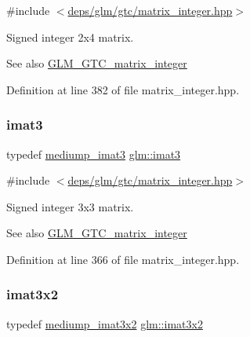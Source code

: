 {\ttfamily \#include $<$\hyperlink{matrix__integer_8hpp}{deps/glm/gtc/matrix\+\_\+integer.\+hpp}$>$}

Signed integer 2x4 matrix. \begin{DoxySeeAlso}{See also}
\hyperlink{group__gtc__matrix__integer}{G\+L\+M\+\_\+\+G\+T\+C\+\_\+matrix\+\_\+integer} 
\end{DoxySeeAlso}


Definition at line 382 of file matrix\+\_\+integer.\+hpp.

\mbox{\label{group__gtc__matrix__integer_ga45481922dd07a3a8e23758286311ee97}} 
\subsubsection{\texorpdfstring{imat3}{imat3}}
{\footnotesize\ttfamily typedef \hyperlink{group__gtc__matrix__integer_gac6ab7a5cfe157ba8deb79a7691ad8263}{mediump\+\_\+imat3} \hyperlink{group__gtc__matrix__integer_ga45481922dd07a3a8e23758286311ee97}{glm\+::imat3}}



{\ttfamily \#include $<$\hyperlink{matrix__integer_8hpp}{deps/glm/gtc/matrix\+\_\+integer.\+hpp}$>$}

Signed integer 3x3 matrix. \begin{DoxySeeAlso}{See also}
\hyperlink{group__gtc__matrix__integer}{G\+L\+M\+\_\+\+G\+T\+C\+\_\+matrix\+\_\+integer} 
\end{DoxySeeAlso}


Definition at line 366 of file matrix\+\_\+integer.\+hpp.

\mbox{\label{group__gtc__matrix__integer_ga04deef94cdfdd3b3b2706e10a32ef7f3}} 
\subsubsection{\texorpdfstring{imat3x2}{imat3x2}}
{\footnotesize\ttfamily typedef \hyperlink{group__gtc__matrix__integer_gae3f0a14fb81eb2edc0caf5b131adb969}{mediump\+\_\+imat3x2} \hyperlink{group__gtc__matrix__integer_ga04deef94cdfdd3b3b2706e10a32ef7f3}{glm\+::imat3x2}}



